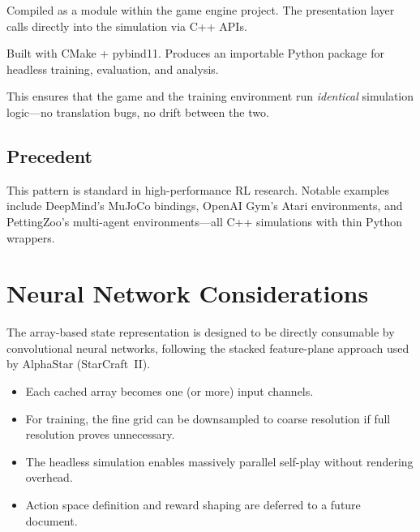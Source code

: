 \documentclass[11pt,a4paper]{article}
\begin{document}
\begin{description}[style=nextline]
    \item[Engine Plugin]
        Compiled as a module within the game engine project.  The
        presentation layer calls directly into the simulation via C++
        APIs.
    \item[Python Module (\texttt{.so} / \texttt{.pyd})]
        Built with CMake + pybind11.  Produces an importable Python
        package for headless training, evaluation, and analysis.
\end{description}

\noindent This ensures that the game and the training environment run
\emph{identical} simulation logic---no translation bugs, no drift
between the two.

\subsection{Precedent}

This pattern is standard in high-performance RL research.  Notable
examples include DeepMind's MuJoCo bindings, OpenAI Gym's Atari
environments, and PettingZoo's multi-agent environments---all C++
simulations with thin Python wrappers.

\section{Neural Network Considerations}
\label{sec:nn}

The array-based state representation is designed to be directly
consumable by convolutional neural networks, following the stacked
feature-plane approach used by AlphaStar (StarCraft~II).

\begin{itemize}
    \item Each cached array becomes one (or more) input channels.
    \item For training, the fine grid can be downsampled to coarse
          resolution if full resolution proves unnecessary.
    \item The headless simulation enables massively parallel self-play
          without rendering overhead.
    \item Action space definition and reward shaping are deferred to a
          future document.
\end{itemize}
\end{document}
